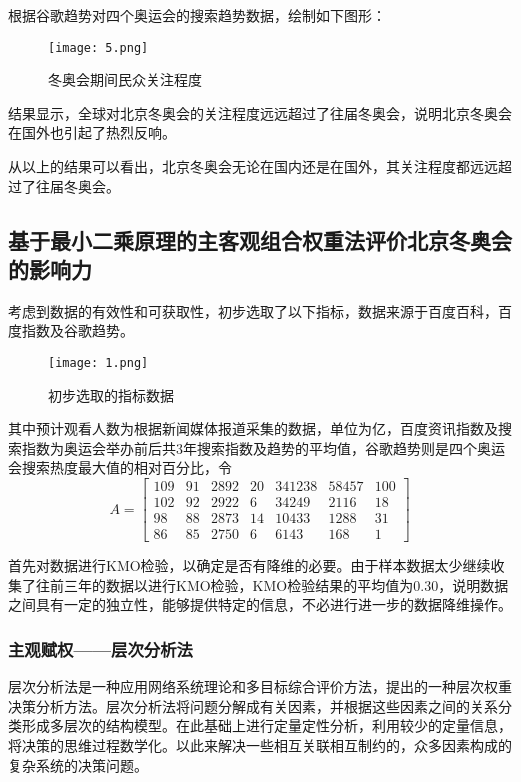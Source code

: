 \documentclass[withoutpreface,bwprint]{cumcmthesis} %
\begin{document}
根据谷歌趋势对四个奥运会的搜索趋势数据，绘制如下图形：
\begin{figure}[H]
	\centering
	\texttt{[image: 5.png]}
	\caption{冬奥会期间民众关注程度}
	\label{5}
\end{figure}
结果显示，全球对北京冬奥会的关注程度远远超过了往届冬奥会，说明北京冬奥会在国外也引起了热烈反响。

从以上的结果可以看出，北京冬奥会无论在国内还是在国外，其关注程度都远远超过了往届冬奥会。

\subsection{基于最小二乘原理的主客观组合权重法评价北京冬奥会的影响力}
	考虑到数据的有效性和可获取性，初步选取了以下指标，数据来源于百度百科，百度指数及谷歌趋势。
\begin{figure}[H]
	\centering
	\texttt{[image: 1.png]}
	\caption{初步选取的指标数据}
	\label{1}
\end{figure}
其中预计观看人数为根据新闻媒体报道采集的数据，单位为亿，百度资讯指数及搜索指数为奥运会举办前后共3年搜索指数及趋势的平均值，谷歌趋势则是四个奥运会搜索热度最大值的相对百分比，令
\[A=\begin{bmatrix}%
109 & 91 & 2892 & 20 &  341238& 58457 & 100\\
102 & 92 & 2922 & 6 & 34249 & 2116 & 18\\
98 &  88& 2873 & 14 & 10433 & 1288 & 31\\
86 & 85 &  2750& 6 & 6143 & 168 &1
\end{bmatrix}
\]



首先对数据进行KMO检验，以确定是否有降维的必要。由于样本数据太少继续收集了往前三年的数据以进行KMO检验，KMO检验结果的平均值为0.30，说明数据之间具有一定的独立性，能够提供特定的信息，不必进行进一步的数据降维操作。
	
	
\subsubsection{主观赋权——层次分析法}
层次分析法是一种应用网络系统理论和多目标综合评价方法，提出的一种层次权重决策分析方法。层次分析法将问题分解成有关因素，并根据这些因素之间的关系分类形成多层次的结构模型。在此基础上进行定量定性分析，利用较少的定量信息，将决策的思维过程数学化。以此来解决一些相互关联相互制约的，众多因素构成的复杂系统的决策问题。
\end{document}
